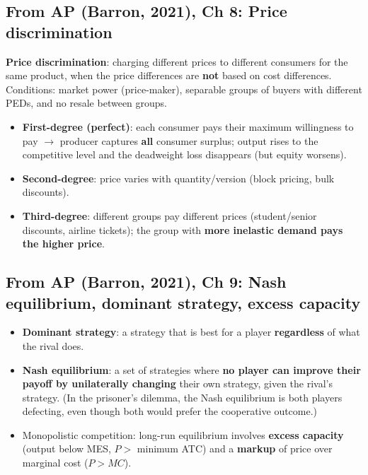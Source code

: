 \documentclass[a4paper,12pt]{article}
\newcommand{\needbold}[1]{\textcolor{red!70!black}{\textbf{#1}}}
\begin{document}
\subsection*{From AP (Barron, 2021), Ch 8: Price discrimination}\label{sec:add-monopoly}
\needbold{Price discrimination}: charging different prices to different consumers for the same product, when the price differences are \textbf{not} based on cost differences. Conditions: market power (price-maker), separable groups of buyers with different PEDs, and no resale between groups.
\begin{itemize}
  \item \textbf{First-degree (perfect)}: each consumer pays their maximum willingness to pay $\to$ producer captures \textbf{all} consumer surplus; output rises to the competitive level and the deadweight loss disappears (but equity worsens).
  \item \textbf{Second-degree}: price varies with quantity/version (block pricing, bulk discounts).
  \item \textbf{Third-degree}: different groups pay different prices (student/senior discounts, airline tickets); the group with \textbf{more inelastic demand pays the higher price}.
\end{itemize}

\subsection*{From AP (Barron, 2021), Ch 9: Nash equilibrium, dominant strategy, excess capacity}
\begin{itemize}
  \item \needbold{Dominant strategy}: a strategy that is best for a player \textbf{regardless} of what the rival does.
  \item \needbold{Nash equilibrium}: a set of strategies where \textbf{no player can improve their payoff by unilaterally changing} their own strategy, given the rival's strategy. (In the prisoner's dilemma, the Nash equilibrium is both players defecting, even though both would prefer the cooperative outcome.)
  \item Monopolistic competition: long-run equilibrium involves \needbold{excess capacity} (output below MES, $P > $ minimum ATC) and a \textbf{markup} of price over marginal cost ($P > MC$).
\end{itemize}
\end{document}
